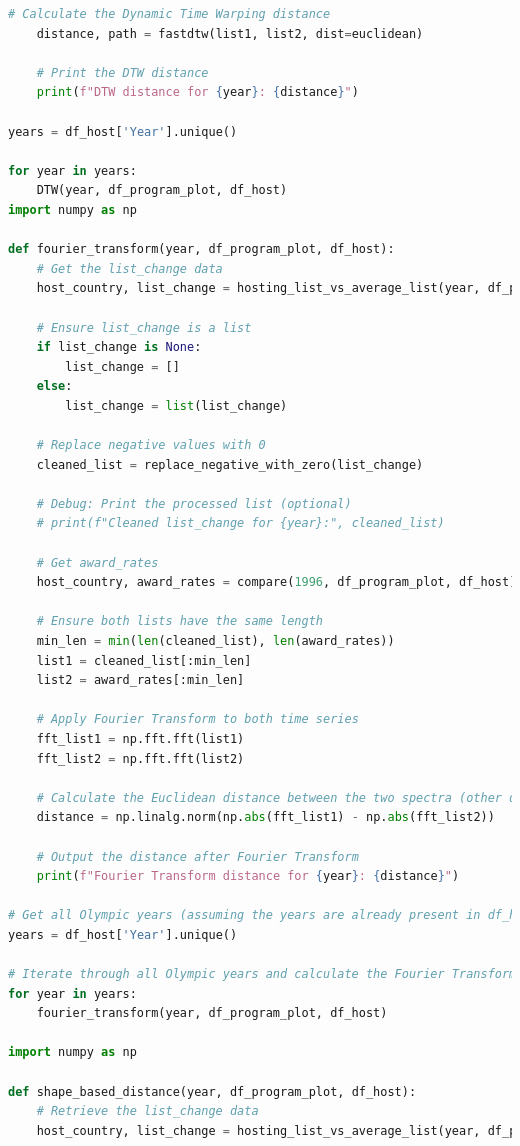 \documentclass[12pt]{article}
\begin{document}
\begin{lstlisting}[language=Python, style=mystyle, caption=data\_analyze.ipynb]
    # Calculate the Dynamic Time Warping distance
    distance, path = fastdtw(list1, list2, dist=euclidean)

    # Print the DTW distance
    print(f"DTW distance for {year}: {distance}")

years = df_host['Year'].unique()

for year in years:
    DTW(year, df_program_plot, df_host) 
import numpy as np

def fourier_transform(year, df_program_plot, df_host):
    # Get the list_change data
    host_country, list_change = hosting_list_vs_average_list(year, df_program_plot, df_host)

    # Ensure list_change is a list
    if list_change is None:
        list_change = []
    else:
        list_change = list(list_change)

    # Replace negative values with 0
    cleaned_list = replace_negative_with_zero(list_change)

    # Debug: Print the processed list (optional)
    # print(f"Cleaned list_change for {year}:", cleaned_list)

    # Get award_rates
    host_country, award_rates = compare(1996, df_program_plot, df_host)

    # Ensure both lists have the same length
    min_len = min(len(cleaned_list), len(award_rates))
    list1 = cleaned_list[:min_len]
    list2 = award_rates[:min_len]

    # Apply Fourier Transform to both time series
    fft_list1 = np.fft.fft(list1)
    fft_list2 = np.fft.fft(list2)

    # Calculate the Euclidean distance between the two spectra (other distance metrics can be used)
    distance = np.linalg.norm(np.abs(fft_list1) - np.abs(fft_list2))

    # Output the distance after Fourier Transform
    print(f"Fourier Transform distance for {year}: {distance}")

# Get all Olympic years (assuming the years are already present in df_host)
years = df_host['Year'].unique()

# Iterate through all Olympic years and calculate the Fourier Transform distance
for year in years:
    fourier_transform(year, df_program_plot, df_host)

import numpy as np

def shape_based_distance(year, df_program_plot, df_host):
    # Retrieve the list_change data
    host_country, list_change = hosting_list_vs_average_list(year, df_program_plot, df_host)


\end{lstlisting}
\end{document}
